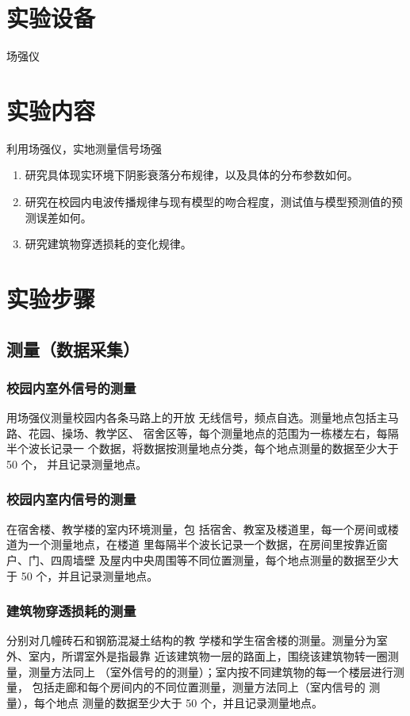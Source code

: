 \documentclass{../ElectromagneticFieldTemplate}
\begin{document}
\section{实验设备}

场强仪

\section{实验内容}

利用场强仪，实地测量信号场强
\begin{enumerate}
    \item 研究具体现实环境下阴影衰落分布规律，以及具体的分布参数如何。
    \item 研究在校园内电波传播规律与现有模型的吻合程度，测试值与模型预测值的预测误差如何。
    \item 研究建筑物穿透损耗的变化规律。
\end{enumerate}

\section{实验步骤}

\subsection{测量（数据采集）}

\subsubsection{校园内室外信号的测量}
用场强仪测量校园内各条马路上的开放
无线信号，频点自选。测量地点包括主马路、花园、操场、教学区、
宿舍区等，每个测量地点的范围为一栋楼左右，每隔半个波长记录一
个数据，将数据按测量地点分类，每个地点测量的数据至少大于50 个，
并且记录测量地点。
\subsubsection{校园内室内信号的测量}
在宿舍楼、教学楼的室内环境测量，包
括宿舍、教室及楼道里，每一个房间或楼道为一个测量地点，在楼道
里每隔半个波长记录一个数据，在房间里按靠近窗户、门、四周墙壁
及屋内中央周围等不同位置测量，每个地点测量的数据至少大于 50
个，并且记录测量地点。
\subsubsection{建筑物穿透损耗的测量}
分别对几幢砖石和钢筋混凝土结构的教
学楼和学生宿舍楼的测量。测量分为室外、室内，所谓室外是指最靠
近该建筑物一层的路面上，围绕该建筑物转一圈测量，测量方法同上
（室外信号的的测量）；室内按不同建筑物的每一个楼层进行测量，
包括走廊和每个房间内的不同位置测量，测量方法同上（室内信号的
测量），每个地点 测量的数据至少大于 50 个，并且记录测量地点。
\end{document}
